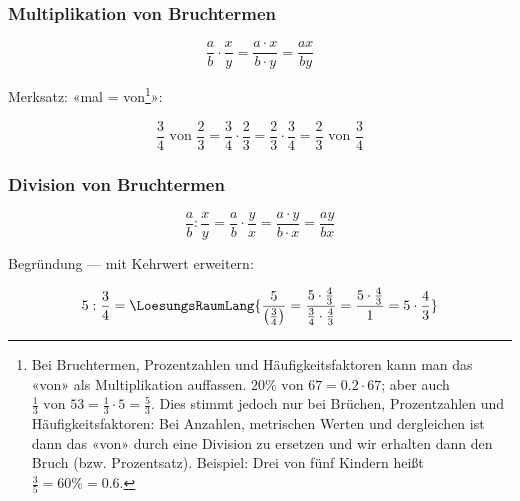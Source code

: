 \newpage


\newpage




\subsubsection{Multiplikation von Bruchtermen}

\begin{gesetz}{}{}
$$\frac{a}{b}\cdot\frac{x}{y} = \frac{a\cdot x}{b\cdot y} = \frac{ax}{by}$$
\end{gesetz}

Merksatz:
«mal = von\footnote{Bei Bruchtermen, Prozentzahlen und
Häufigkeitsfaktoren kann man das «von» als Multiplikation
auffassen. $20\% \textrm{ von } 67 = 0.2 \cdot{} 67$; aber auch
$\frac{1}{3} \textrm{ von } 53
= \frac{1}{3}\cdot{5}=\frac{5}{3}$. Dies stimmt jedoch nur bei
Brüchen, Prozentzahlen und Häufigkeitsfaktoren: Bei Anzahlen,
metrischen Werten und dergleichen ist dann das «von» durch eine
Division zu ersetzen und wir erhalten dann den Bruch
(bzw. Prozentsatz). Beispiel: Drei von fünf Kindern heißt $\frac{3}{5}
= 60\% = 0.6$.}»:

$$\frac34 \textrm{ von } \frac23 = \frac34\cdot\frac23
=  \frac23\cdot\frac34 = \frac23 \textrm{ von } \frac34$$


\subsubsection{Division von Bruchtermen}
\begin{gesetz}{}{}
$$\frac{a}{b} : \frac{x}{y}=\frac{a}{b}\cdot\frac{y}{x} = \frac{a\cdot y}{b\cdot x} = \frac{ay}{bx}$$
\end{gesetz}

Begründung — mit Kehrwert erweitern:

$$5 : \frac{3}{4} = \LoesungsRaumLang{
\frac{5}{\left(\frac{3}{4}\right)} =
\frac{5\cdot{}\frac43}{\frac34\cdot{}\frac43} =
\frac{5\cdot{}\frac43}{1} = 5 \cdot{} \frac43}$$
\newpage

